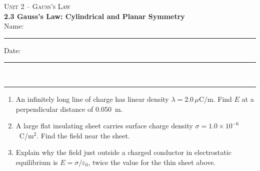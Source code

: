 \documentclass[11pt,letterpaper]{article}
\begin{document}
{\small\textsc{Unit 2 -- Gauss's Law}}\\[2pt]{\Large\bfseries 2.3 Gauss's Law: Cylindrical and Planar Symmetry}\\[8pt]Name: \rule{2.4in}{0.4pt} \hfill Date: \rule{1.4in}{0.4pt}\\[4pt]\hrule\vspace{10pt}{\small\itshape Placeholder worksheet for the site prototype. Free for classroom use.}\vspace{6pt}
\begin{enumerate}[leftmargin=*,itemsep=10pt]
\item An infinitely long line of charge has linear density $\lambda = 2.0\,\mu\text{C/m}$. Find $E$ at a perpendicular distance of $0.050$~m.
\vspace{2.2in}
\item A large flat insulating sheet carries surface charge density $\sigma = 1.0\times10^{-6}$~C/m$^2$. Find the field near the sheet.
\vspace{2.2in}
\item Explain why the field just outside a charged conductor in electrostatic equilibrium is $E = \sigma/\varepsilon_0$, twice the value for the thin sheet above.
\vspace{2.2in}
\end{enumerate}
\end{document}
